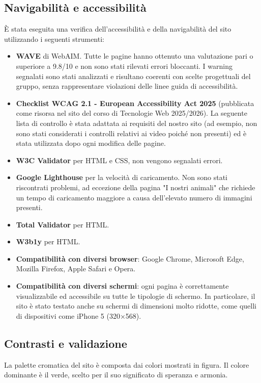 \documentclass[10pt, letterpaper]{article}
\begin{document}
\subsection{Navigabilità e accessibilità}
È stata eseguita una verifica dell’accessibilità e della navigabilità del sito utilizzando i seguenti strumenti: 
\begin{itemize}
\item \textbf{WAVE} di WebAIM. Tutte le pagine hanno ottenuto una valutazione pari o superiore a 9.8/10 e non sono stati rilevati errori bloccanti. I warning segnalati sono stati analizzati e risultano coerenti con scelte progettuali del gruppo, senza rappresentare violazioni delle linee guida di accessibilità.
\item \textbf{Checklist WCAG 2.1 - European Accessibility Act 2025} (pubblicata come risorsa nel sito del corso di Tecnologie Web 2025/2026). La seguente lista di controllo è stata adattata ai requisiti del nostro sito (ad esempio, non sono stati considerati i controlli relativi ai video poiché non presenti) ed è stata utilizzata dopo ogni modifica delle pagine.
\item \textbf{W3C Validator} per HTML e CSS, non vengono segnalati errori.
\item \textbf{Google Lighthouse} per la velocità di caricamento. Non sono stati riscontrati problemi, ad eccezione della pagina "I nostri animali" che richiede un tempo di caricamento maggiore a causa dell'elevato numero di immagini presenti. 
\item \textbf{Total Validator} per HTML.
\item \textbf{W3b1y} per HTML.
\item \textbf{Compatibilità con diversi browser}: Google Chrome, Microsoft Edge, Mozilla Firefox, Apple Safari e Opera.
\item \textbf{Compatibilità con diversi schermi}: ogni pagina è correttamente visualizzabile ed accessibile su tutte le tipologie di schermo. In particolare, il sito è stato testato anche su schermi di dimensioni molto ridotte, come quelli di dispositivi come iPhone 5 (320×568).
\end{itemize}

\subsection{Contrasti e validazione}
La palette cromatica del sito è composta dai colori mostrati in figura. Il colore dominante è il verde, scelto per il suo significato di speranza e armonia. 
\end{document}
